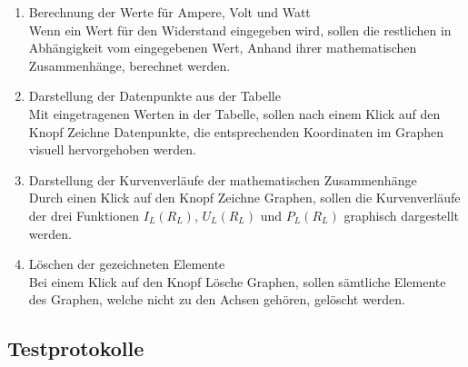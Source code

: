 \documentclass[a4paper]{article}
\begin{document}
    \begin{enumerate}
        \item Berechnung der Werte für Ampere, Volt und Watt\\
        \label{test:calc}
        Wenn ein Wert für den Widerstand eingegeben wird, sollen die restlichen in Abhängigkeit vom eingegebenen Wert, Anhand ihrer mathematischen Zusammenhänge, berechnet werden.
        
        \item Darstellung der Datenpunkte aus der Tabelle\\
        \label{test:point}
        Mit eingetragenen Werten in der Tabelle, sollen nach einem Klick auf den Knopf \glqq Zeichne Datenpunkte\grqq{}, die entsprechenden Koordinaten im Graphen visuell hervorgehoben werden.
        
        \item Darstellung der Kurvenverläufe der mathematischen Zusammenhänge\\
        \label{test:curve}
        Durch einen Klick auf den Knopf \glqq Zeichne Graphen\grqq{}, sollen die Kurvenverläufe der drei Funktionen $I_L(R_L)$, $U_L(R_L)$ und $P_L(R_L)$ graphisch dargestellt werden.
        
        \item Löschen der gezeichneten Elemente\\
        \label{test:delete}
        Bei einem Klick auf den Knopf \glqq Lösche Graphen\grqq{}, sollen sämtliche Elemente des Graphen, welche nicht zu den Achsen gehören, gelöscht werden.
        
    \end{enumerate}

\subsection{Testprotokolle}
\end{document}
